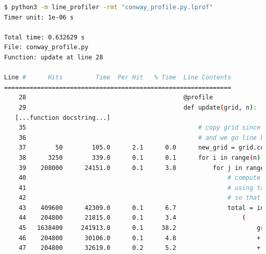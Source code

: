 \documentclass[a4paper,12pt]{article}
\begin{document}
\begin{lstlisting}[language=bash,basicstyle=\tiny\ttfamily]
$ python3 -m line_profiler -rmt "conway_profile.py.lprof"
Timer unit: 1e-06 s

Total time: 0.632629 s
File: conway_profile.py
Function: update at line 28

Line #      Hits         Time  Per Hit   % Time  Line Contents
==============================================================
    28                                           @profile                                                                                   
    29                                           def update(grid, n):                                                                       
   [...function docstring...]
    35                                               # copy grid since we require 8 neighbors for calculation                               
    36                                               # and we go line by line                                                               
    37        50        105.0      2.1      0.0      new_grid = grid.copy()                                                                 
    38      3250        339.0      0.1      0.1      for i in range(n):                                                                     
    39    208000      24151.0      0.1      3.8          for j in range(n):                                                                 
    40                                                       # compute 8-neghbor sum                                                        
    41                                                       # using toroidal boundary conditions - x and y wrap around                     
    42                                                       # so that the simulaton takes place on a toroidal surface.                     
    43    409600      42309.0      0.1      6.7              total = int(                                                                   
    44    204800      21815.0      0.1      3.4                  (                                                                          
    45   1638400     241913.0      0.1     38.2                      grid[i, (j - 1) % n]                                                   
    46    204800      30106.0      0.1      4.8                      + grid[i, (j + 1) % n]                                                 
    47    204800      32619.0      0.2      5.2                      + grid[(i - 1) % n, j]                                                 

\end{lstlisting}
\end{document}
